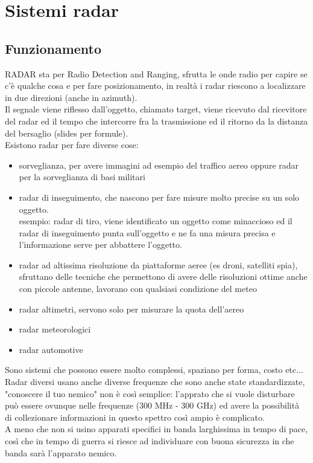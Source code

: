 \documentclass[oneside, 12pt]{extbook}
\begin{document}
\chapter{Sistemi radar}

\section{Funzionamento}
RADAR sta per Radio Detection and Ranging, sfrutta le onde radio per capire se c'è qualche cosa e per fare posizionamento, in realtà i radar riescono a localizzare in due direzioni (anche in azimuth).\\
Il segnale viene riflesso dall'oggetto, chiamato target, viene ricevuto dal ricevitore del radar ed il tempo che intercorre fra la trasmissione ed il ritorno da la distanza del bersaglio (slides per formule).\\
Esistono radar per fare diverse cose:
\begin{itemize}
	\item sorveglianza, per avere immagini ad esempio del traffico aereo oppure radar per la sorveglianza di basi militari
	\item radar di inseguimento, che nascono per fare misure molto precise su un solo oggetto.\\
	esempio: radar di tiro, viene identificato un oggetto come minaccioso ed il radar di inseguimento punta sull'oggetto e ne fa una misura precisa e l'informazione serve per abbattere l'oggetto.
	\item radar ad altissima risoluzione da piattaforme aeree (es droni, satelliti spia), sfruttano delle tecniche che permettono di avere delle risoluzioni ottime anche con piccole antenne, lavorano con qualsiasi condizione del meteo
	\item radar altimetri, servono solo per misurare la quota dell'aereo
	\item radar meteorologici
	\item radar automotive
\end{itemize}
Sono sistemi che possono essere molto complessi, spaziano per forma, costo etc...\\
Radar diversi usano anche diverse frequenze che sono anche state standardizzate, "conoscere il tuo nemico" non è così semplice: l'apprato che si vuole disturbare può essere ovunque nelle frequenze (300 MHz - 300 GHz) ed avere la possibilità di collezionare informazioni in questo spettro così ampio è complicato.\\
A meno che non si usino apparati specifici in banda larghissima in tempo di pace, così che in tempo di guerra si riesce ad individuare con buona sicurezza in che banda sarà l'apparato nemico.\\
\end{document}
